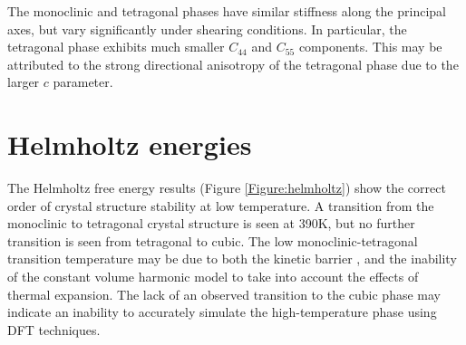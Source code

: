 The monoclinic and tetragonal phases have similar stiffness along the principal axes, but vary significantly under shearing conditions. In particular, the tetragonal phase exhibits much smaller $C_{44}$ and $C_{55}$ components. This may be attributed to the strong directional anisotropy of the tetragonal phase due to the larger $c$ parameter. 





\section{Helmholtz energies}



The Helmholtz free energy results (Figure \ref{Figure:helmholtz}) show the correct order of crystal structure stability at low temperature. A transition from the monoclinic to tetragonal crystal structure is seen at 390K, but no further transition is seen from tetragonal to cubic. The low monoclinic-tetragonal transition temperature may be due to both the kinetic barrier \cite{bansal1972martensitic,bansal1974martensitic}, and the inability of the constant volume harmonic model to take into account the effects of thermal expansion. The lack of an observed transition to the cubic phase may indicate an inability to accurately simulate the high-temperature phase using DFT techniques. 

